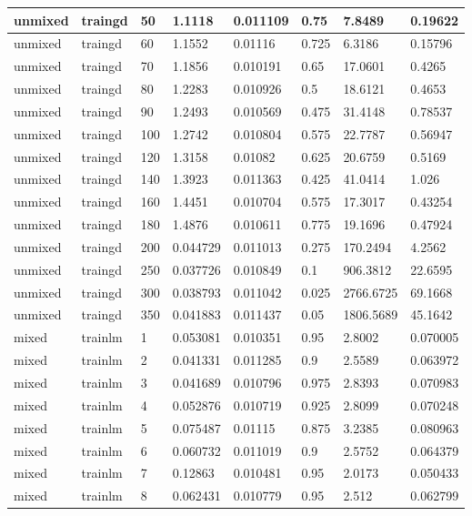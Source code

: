 \begin{longtable}{llllllll}
unmixed & traingd & 50 & 1.1118 & 0.011109 & 0.75 & 7.8489 & 0.19622 \\ \hline 
unmixed & traingd & 60 & 1.1552 & 0.01116 & 0.725 & 6.3186 & 0.15796 \\ \hline 
unmixed & traingd & 70 & 1.1856 & 0.010191 & 0.65 & 17.0601 & 0.4265 \\ \hline 
unmixed & traingd & 80 & 1.2283 & 0.010926 & 0.5 & 18.6121 & 0.4653 \\ \hline 
unmixed & traingd & 90 & 1.2493 & 0.010569 & 0.475 & 31.4148 & 0.78537 \\ \hline 
unmixed & traingd & 100 & 1.2742 & 0.010804 & 0.575 & 22.7787 & 0.56947 \\ \hline 
unmixed & traingd & 120 & 1.3158 & 0.01082 & 0.625 & 20.6759 & 0.5169 \\ \hline 
unmixed & traingd & 140 & 1.3923 & 0.011363 & 0.425 & 41.0414 & 1.026 \\ \hline 
unmixed & traingd & 160 & 1.4451 & 0.010704 & 0.575 & 17.3017 & 0.43254 \\ \hline 
unmixed & traingd & 180 & 1.4876 & 0.010611 & 0.775 & 19.1696 & 0.47924 \\ \hline 
unmixed & traingd & 200 & 0.044729 & 0.011013 & 0.275 & 170.2494 & 4.2562 \\ \hline 
unmixed & traingd & 250 & 0.037726 & 0.010849 & 0.1 & 906.3812 & 22.6595 \\ \hline 
unmixed & traingd & 300 & 0.038793 & 0.011042 & 0.025 & 2766.6725 & 69.1668 \\ \hline 
unmixed & traingd & 350 & 0.041883 & 0.011437 & 0.05 & 1806.5689 & 45.1642 \\ \hline 
mixed & trainlm & 1 & 0.053081 & 0.010351 & 0.95 & 2.8002 & 0.070005 \\ \hline 
mixed & trainlm & 2 & 0.041331 & 0.011285 & 0.9 & 2.5589 & 0.063972 \\ \hline 
mixed & trainlm & 3 & 0.041689 & 0.010796 & 0.975 & 2.8393 & 0.070983 \\ \hline 
mixed & trainlm & 4 & 0.052876 & 0.010719 & 0.925 & 2.8099 & 0.070248 \\ \hline 
mixed & trainlm & 5 & 0.075487 & 0.01115 & 0.875 & 3.2385 & 0.080963 \\ \hline 
mixed & trainlm & 6 & 0.060732 & 0.011019 & 0.9 & 2.5752 & 0.064379 \\ \hline 
mixed & trainlm & 7 & 0.12863 & 0.010481 & 0.95 & 2.0173 & 0.050433 \\ \hline 
mixed & trainlm & 8 & 0.062431 & 0.010779 & 0.95 & 2.512 & 0.062799 \\ \hline 

\end{longtable}
